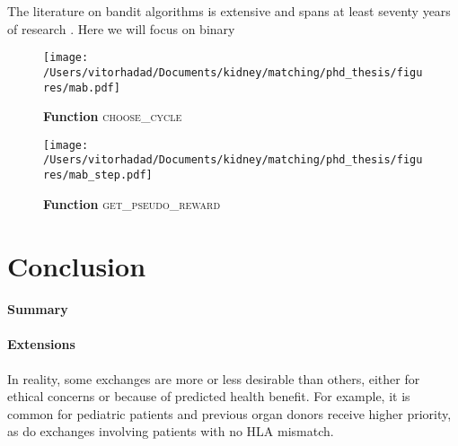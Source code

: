 \documentclass[format=acmsmall, review=false]{acmart}
\begin{document}
 The literature on bandit algorithms is extensive and spans at least seventy years of research \citep{lattimore2018bandits}. Here we will focus on binary 

 \begin{figure}
  \centering
  \hspace*{-1cm}
  \texttt{[image: /Users/vitorhadad/Documents/kidney/matching/phd\_thesis/figures/mab.pdf]}
  \caption{\textbf{Function} \textsc{choose\_cycle}}
  \label{fig:mab}
  \end{figure}

  \begin{figure}
  \centering
  \texttt{[image: /Users/vitorhadad/Documents/kidney/matching/phd\_thesis/figures/mab\_step.pdf]}
  \caption{\textbf{Function} \textsc{get\_pseudo\_reward} }
  \label{fig:get_pseudo_reward}
  \end{figure}




\section{Conclusion}

\paragraph{Summary}

\paragraph{Extensions} In reality, some exchanges are more or less desirable than others, either for ethical concerns or because of predicted health benefit. For example, it is common for pediatric patients and previous organ donors receive higher priority, as do exchanges involving patients with no HLA mismatch. 


\newcommand\mycommfont[1]{\footnotesize\upshape\textcolor{blue}{#1}}
\end{document}
